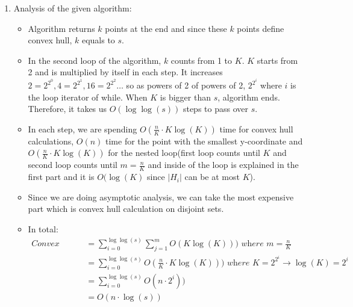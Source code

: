 \begin{enumerate}
  \item Analysis of the given algorithm:
    \begin{itemize}
      \item Algorithm returns $k$ points at the end and since these $k$ points define convex hull, $k$ equals to $s$.
      \item In the second loop of the algorithm, $k$ counts from 1 to $K$. $K$ starts from 2 and is multiplied by itself in each step. It increases $2 = 2^{2^0}, 4 = 2^{2^1}, 16 = 2^{2^2} \dots$ so as powers of 2 of powers of 2, $2^{2^i}$ where $i$ is the loop iterator of while. When $K$ is bigger than $s$, algorithm ends. Therefore, it takes us $O(\log\log(s))$ steps to pass over $s$.
      \item In each step, we are spending $O(\frac{n}{K} \cdot K \log(K))$ time for convex hull calculations, $O(n)$ time for the point with the smallest y-coordinate and $O(\frac{n}{K} \cdot K \log(K))$ for the nested loop(first loop counts until $K$ and second loop counts until $m=\frac{n}{K}$ and inside of the loop is explained in the first part and it is $O(\log(K)$ since $|H_i|$ can be at most $K$).
      \item Since we are doing asymptotic analysis, we can take the most expensive part which is convex hull calculation on disjoint sets. 
      \item In total:
        \begin{align*}
          \textit{Convex Hull Calculations} &=\sum^{\log\log(s)}_{i=0} {\sum^{m}_{j=1} O(K \log(K)))} \textit{ where } m = \frac{n}{K} \\
          &= \sum^{\log\log(s)}_{i=0} O(\frac{n}{K} \cdot K \log(K)))  \textit{ where } K = 2^{2^i} \rightarrow \log(K) = 2^i \\
          &= \sum^{\log\log(s)}_{i=0} O(n \cdot 2^i)) \\
          &= O(n \cdot \log(s))
        \end{align*}               
    \end{itemize}
  

\end{enumerate}
